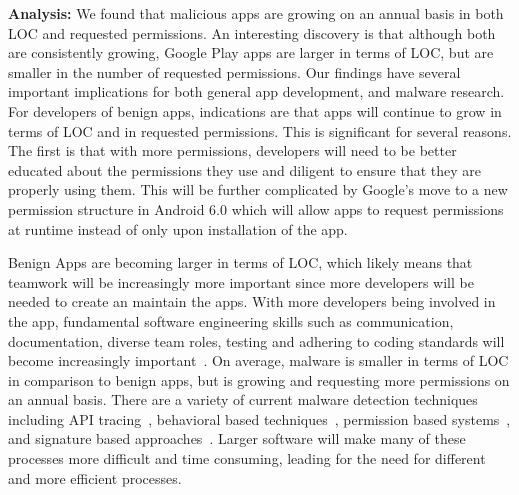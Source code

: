 \documentclass{llncs}
\begin{document}
\noindent
\textbf{Analysis:} We found that malicious apps are growing on an annual basis in both LOC and requested permissions. An interesting discovery is that although both are consistently growing, Google Play apps are larger in terms of LOC, but are smaller in the number of requested permissions. Our findings have several important implications for both general app development, and malware research. For developers of benign apps, indications are that apps will continue to grow in terms of LOC and in requested permissions. This is significant for several reasons. The first is that with more permissions, developers will need to be better educated about the permissions they use and diligent to ensure that they are properly using them. This will be further complicated by Google's move to a new permission structure in Android 6.0 which will allow apps to request permissions at runtime instead of only upon installation of the app.

Benign Apps are becoming larger in terms of LOC, which likely means that teamwork will be increasingly more important since more developers will be needed to create an maintain the apps. With more developers being involved in the app, fundamental software engineering skills such as communication, documentation, diverse team roles, testing and adhering to coding standards will become increasingly important~\cite{Pressman:2009:SEP:1593949}. On average, malware is smaller in terms of LOC in comparison to benign apps, but is growing and requesting more permissions on an annual basis. There are a variety of current malware detection techniques including API tracing~\cite{6298136}, behavioral based techniques~\cite{burguera2011crowdroid, shabtai2012andromaly}, permission based systems~\cite{talha2015apk}, and signature based approaches~\cite{Feng:2014:ASD:2635868.2635869}. Larger software will make many of these processes more difficult and time consuming, leading for the need for different and more efficient processes.
\end{document}
